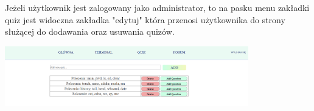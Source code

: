 \documentclass[10pt,a4paper]{report}
\begin{document}
\begin{adjustwidth}{2cm}{2cm}
\begin{minipage}{\linewidth}
\begin{center}
\end{center}
\end{minipage}
\begin{minipage}{1\linewidth}
\vspace{0.3cm}
Jeżeli użytkownik jest zalogowany jako administrator, to na pasku menu zakładki quiz jest widoczna zakładka "edytuj" która przenosi użytkownika do strony służącej do dodawania oraz usuwania quizów.\\ 
\end{minipage}
\begin{minipage}{\linewidth}
\begin{center}
  \includegraphics[width=400px]{project/add_quiz.png}
\end{center}
\end{minipage}

\end{adjustwidth}
\end{document}
